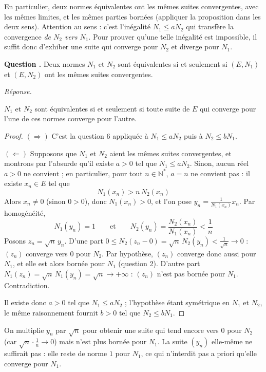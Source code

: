 \documentclass[11pt]{article}
\newcounter{qnum}
\newcommand{\question}[1]{%
\stepcounter{qnum}%
\bigskip
\noindent\textbf{Question \theqnum.} #1\par}
\newcommand{\reponse}{\noindent\textit{Réponse.}\ }
\begin{document}
\begin{remarque}
En particulier, deux normes équivalentes ont les mêmes suites convergentes, avec les mêmes limites, et les mêmes parties bornées (appliquer la proposition dans les deux sens). Attention au sens : c'est l'inégalité $N_1\leq aN_2$ qui transfère la convergence \emph{de $N_2$ vers $N_1$}. Pour prouver qu'une telle inégalité est impossible, il suffit donc d'exhiber une suite qui converge pour $N_2$ et diverge pour $N_1$.
\end{remarque}

\question{Deux normes $N_1$ et $N_2$ sont équivalentes si et seulement si $(E,N_1)$ et $(E,N_2)$ ont les mêmes suites convergentes.}
\reponse

\begin{prop}
\label{prop:normes-equivalentes-suites}
$N_1$ et $N_2$ sont équivalentes si et seulement si toute suite de $E$ qui converge pour l'une de ces normes converge pour l'autre.
\end{prop}

\begin{proof}
$(\Rightarrow)$ C'est la question 6 appliquée à $N_1\leq aN_2$ puis à $N_2\leq bN_1$.

$(\Leftarrow)$ Supposons que $N_1$ et $N_2$ aient les mêmes suites convergentes, et montrons par l'absurde qu'il existe $a>0$ tel que $N_1\leq aN_2$. Sinon, aucun réel $a>0$ ne convient ; en particulier, pour tout $n\in\mathbb{N}^*$, $a=n$ ne convient pas : il existe $x_n\in E$ tel que
\[N_1(x_n)>n\,N_2(x_n)\]
Alors $x_n\neq 0$ (sinon $0>0$), donc $N_1(x_n)>0$, et l'on pose $y_n=\frac{1}{N_1(x_n)}x_n$. Par homogénéité,
\[N_1(y_n)=1\qquad\text{et}\qquad N_2(y_n)=\frac{N_2(x_n)}{N_1(x_n)}<\frac1n\]
Posons $z_n=\sqrt n\,y_n$. D'une part $0\leq N_2(z_n-0)=\sqrt n\,N_2(y_n)<\frac{1}{\sqrt n}\to 0$ : $(z_n)$ converge vers $0$ pour $N_2$. Par hypothèse, $(z_n)$ converge donc aussi pour $N_1$, et elle est alors bornée pour $N_1$ (question 2). D'autre part $N_1(z_n)=\sqrt n\,N_1(y_n)=\sqrt n\to+\infty$ : $(z_n)$ n'est pas bornée pour $N_1$. Contradiction.

Il existe donc $a>0$ tel que $N_1\leq aN_2$ ; l'hypothèse étant symétrique en $N_1$ et $N_2$, le même raisonnement fournit $b>0$ tel que $N_2\leq bN_1$.
\end{proof}

\begin{remarque}
On multiplie $y_n$ par $\sqrt n$ pour obtenir une suite qui tend encore vers $0$ pour $N_2$ (car $\sqrt n\cdot\frac1n\to 0$) mais n'est plus bornée pour $N_1$. La suite $(y_n)$ elle-même ne suffirait pas : elle reste de norme $1$ pour $N_1$, ce qui n'interdit pas a priori qu'elle converge pour $N_1$.
\end{remarque}
\end{document}
